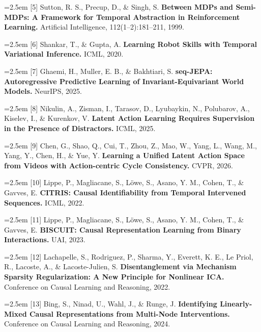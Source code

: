 \documentclass[11pt]{article}
\begin{document}
\noindent\hangindent=2.5em [5] Sutton, R. S., Precup, D., \& Singh, S. \textbf{Between MDPs and Semi-MDPs: A Framework for Temporal Abstraction in Reinforcement Learning.} Artificial Intelligence, 112(1--2):181--211, 1999.\par

\noindent\hangindent=2.5em [6] Shankar, T., \& Gupta, A. \textbf{Learning Robot Skills with Temporal Variational Inference.} ICML, 2020.\par

\noindent\hangindent=2.5em [7] Ghaemi, H., Muller, E. B., \& Bakhtiari, S. \textbf{seq-JEPA: Autoregressive Predictive Learning of Invariant-Equivariant World Models.} NeurIPS, 2025.\par

\noindent\hangindent=2.5em [8] Nikulin, A., Zisman, I., Tarasov, D., Lyubaykin, N., Polubarov, A., Kiselev, I., \& Kurenkov, V. \textbf{Latent Action Learning Requires Supervision in the Presence of Distractors.} ICML, 2025.\par

\noindent\hangindent=2.5em [9] Chen, G., Shao, Q., Cui, T., Zhou, Z., Mao, W., Yang, L., Wang, M., Yang, Y., Chen, H., \& Yue, Y. \textbf{Learning a Unified Latent Action Space from Videos with Action-centric Cycle Consistency.} CVPR, 2026.\par

\noindent\hangindent=2.5em [10] Lippe, P., Magliacane, S., L\"owe, S., Asano, Y. M., Cohen, T., \& Gavves, E. \textbf{CITRIS: Causal Identifiability from Temporal Intervened Sequences.} ICML, 2022.\par

\noindent\hangindent=2.5em [11] Lippe, P., Magliacane, S., L\"owe, S., Asano, Y. M., Cohen, T., \& Gavves, E. \textbf{BISCUIT: Causal Representation Learning from Binary Interactions.} UAI, 2023.\par

\noindent\hangindent=2.5em [12] Lachapelle, S., Rodriguez, P., Sharma, Y., Everett, K. E., Le Priol, R., Lacoste, A., \& Lacoste-Julien, S. \textbf{Disentanglement via Mechanism Sparsity Regularization: A New Principle for Nonlinear ICA.} Conference on Causal Learning and Reasoning, 2022.\par

\noindent\hangindent=2.5em [13] Bing, S., Ninad, U., Wahl, J., \& Runge, J. \textbf{Identifying Linearly-Mixed Causal Representations from Multi-Node Interventions.} Conference on Causal Learning and Reasoning, 2024.\par
\end{document}
